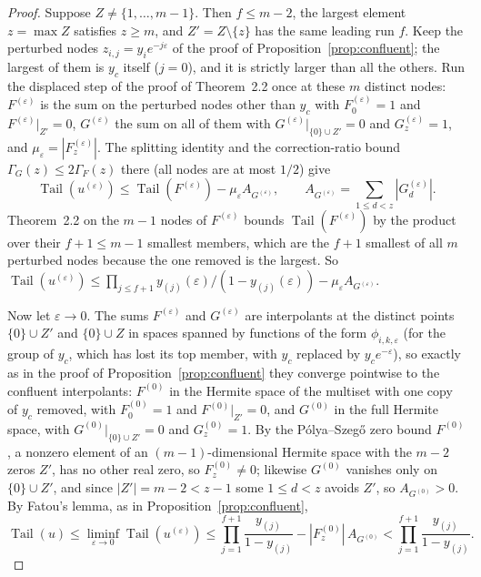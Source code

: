\documentclass[11pt]{article}
\theoremstyle{definition}
\theoremstyle{plain}
\DeclareMathOperator{\Tail}{Tail}
\begin{document}
\begin{proof}
Suppose $Z\ne\{1,\ldots,m-1\}$.  Then $f\le m-2$, the largest element
$z=\max Z$ satisfies $z\ge m$, and $Z'=Z\setminus\{z\}$ has the same leading
run $f$.  Keep the perturbed nodes $z_{i,j}=y_ie^{-j\varepsilon}$ of the
proof of Proposition~\ref{prop:confluent}; the largest of them is
$y_c$ itself ($j=0$), and it is strictly larger than all the others.  Run the
displaced step of the proof of Theorem~2.2 once at these $m$ distinct nodes:
$F^{(\varepsilon)}$ is the sum on the perturbed nodes other than $y_c$ with
$F^{(\varepsilon)}_0=1$ and $F^{(\varepsilon)}|_{Z'}=0$, $G^{(\varepsilon)}$
the sum on all of them with $G^{(\varepsilon)}|_{\{0\}\cup Z'}=0$ and
$G^{(\varepsilon)}_z=1$, and $\mu_\varepsilon=|F^{(\varepsilon)}_z|$.  The
splitting identity and the correction-ratio bound
$\Gamma_G(z)\le2\Gamma_F(z)$ there (all nodes are at most $1/2$) give
\[
  \Tail(u^{(\varepsilon)})
  \le\Tail(F^{(\varepsilon)})-\mu_\varepsilon A_{G^{(\varepsilon)}},
  \qquad
  A_{G^{(\varepsilon)}}=\sum_{1\le d<z}|G^{(\varepsilon)}_d| .
\]
Theorem~2.2 on the $m-1$ nodes of $F^{(\varepsilon)}$ bounds
$\Tail(F^{(\varepsilon)})$ by the product over their $f+1\le m-1$ smallest
members, which are the $f+1$ smallest of all $m$ perturbed nodes because the
one removed is the largest.  So
$\Tail(u^{(\varepsilon)})\le\prod_{j\le f+1}y_{(j)}(\varepsilon)/(1-y_{(j)}(\varepsilon))
-\mu_\varepsilon A_{G^{(\varepsilon)}}$.

Now let $\varepsilon\to0$.  The sums $F^{(\varepsilon)}$ and
$G^{(\varepsilon)}$ are interpolants at the distinct points $\{0\}\cup Z'$
and $\{0\}\cup Z$ in spaces spanned by functions of the form
$\phi_{i,k,\varepsilon}$ (for the group of $y_c$, which has lost its top
member, with $y_c$ replaced by $y_ce^{-\varepsilon}$), so exactly as in the
proof of Proposition~\ref{prop:confluent} they converge pointwise to the
confluent interpolants: $F^{(0)}$ in the Hermite space of the multiset with one
copy of $y_c$ removed, with $F^{(0)}_0=1$ and $F^{(0)}|_{Z'}=0$, and $G^{(0)}$
in the full Hermite space, with $G^{(0)}|_{\{0\}\cup Z'}=0$ and $G^{(0)}_z=1$.
By the P\'olya--Szeg\H o zero bound $F^{(0)}$, a nonzero element of an
$(m-1)$-dimensional Hermite space with the $m-2$ zeros $Z'$, has no other real
zero, so $F^{(0)}_z\ne0$; likewise $G^{(0)}$ vanishes only on
$\{0\}\cup Z'$, and since $|Z'|=m-2<z-1$ some $1\le d<z$ avoids $Z'$, so
$A_{G^{(0)}}>0$.  By Fatou's lemma, as in Proposition~\ref{prop:confluent},
\[
  \Tail(u)\le\liminf_{\varepsilon\to0}\Tail(u^{(\varepsilon)})
  \le\prod_{j=1}^{f+1}\frac{y_{(j)}}{1-y_{(j)}}-|F^{(0)}_z|\,A_{G^{(0)}}
  <\prod_{j=1}^{f+1}\frac{y_{(j)}}{1-y_{(j)}} .
\]
\end{proof}
\end{document}

